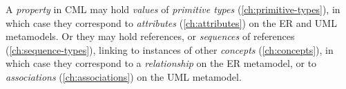 A \emph{property} in CML may hold \emph{values} of \emph{primitive types} (\ref{ch:primitive-types}),
in which case they correspond to \emph{attributes} (\ref{ch:attributes})
on the ER \cite{er} and UML \cite{uml} metamodels.
Or they may hold references, or \emph{sequences} of references (\ref{ch:sequence-types}),
linking to instances of other \emph{concepts} (\ref{ch:concepts}),
in which case they correspond to a \emph{relationship} on the ER metamodel,
or to \emph{associations} (\ref{ch:associations}) on the UML metamodel.
